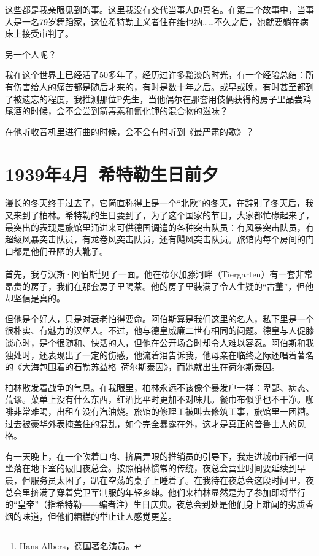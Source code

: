 \documentclass[UTF8]{ctexart}
\begin{document}
这些都是我亲眼见到的事。这里我没有交代当事人的真名。在第二个故事中，当事人是一名79岁舞蹈家，这位希特勒主义者住在维也纳……不久之后，她就要躺在病床上接受审判了。

另一个人呢？

我在这个世界上已经活了50多年了，经历过许多黯淡的时光，有一个经验总结：所有伤害给人的痛苦都是随后才来的，有时是数十年之后。或早或晚，有时甚至都到了被遗忘的程度，我推测那位P先生，当他偶尔在那套用伎俩获得的房子里品尝鸡尾酒的时候，会不会尝到箭毒素和氰化钾的混合物的滋味？

在他听收音机里进行曲的时候，会不会有时听到《最严肃的歌》？


\section{1939年4月\ 希特勒生日前夕}

漫长的冬天终于过去了，它简直称得上是一个“北欧”的冬天，在辞别了冬天后，我又来到了柏林。希特勒的生日要到了，为了这个国家的节日，大家都忙碌起来了，最突出的表现是旅馆里涌进来可供德国调遣的各种突击队员：有风暴突击队员，有超级风暴突击队员，有龙卷风突击队员，还有飓风突击队员。旅馆内每个房间的门口都是他们丑陋的大靴子。

首先，我与汉斯·阿伯斯\footnote{Hans Albers，德国著名演员。}见了一面。他在蒂尔加滕河畔（Tiergarten）有一套非常昂贵的房子，我们在那套房子里喝茶。他的房子里装满了令人生疑的“古董”，但他却坚信是真的。

但他是个好人，只是对衰老怕得要命。阿伯斯算是我们这里的名人，私下里是一个很朴实、有魅力的汉堡人。不过，他与德皇威廉二世有相同的问题。德皇与人促膝谈心时，是个很随和、快活的人，但他在公开场合时却令人难以容忍。阿伯斯和我独处时，还表现出了一定的伤感，他流着泪告诉我，他母亲在临终之际还唱着著名的《大海包围着的石勒苏益格–荷尔斯泰因》，而她就出生在荷尔斯泰因。

柏林散发着战争的气息。在我眼里，柏林永远不该像个暴发户一样：卑鄙、病态、荒谬。菜单上没有什么东西，红酒比平时更加不对味儿。餐巾布似乎也不干净。咖啡非常难喝，出租车没有汽油烧。旅馆的修理工被叫去修筑工事，旅馆里一团糟。过去被豪华外表掩盖住的混乱，如今完全暴露在外，这才是真正的普鲁士人的风格。

有一天晚上，在一个吹着口哨、挤眉弄眼的推销员的引导下，我走进城市西部一间坐落在地下室的破旧夜总会。按照柏林惯常的传统，夜总会营业时间要延续到早晨，但服务员太困了，趴在空荡的桌子上睡着了。在我待在夜总会这段时间里，夜总会里挤满了穿着党卫军制服的年轻乡绅。他们来柏林显然是为了参加即将举行的“皇帝”（指希特勒——编者注）生日庆典。夜总会到处是他们身上难闻的劣质香烟的味道，但他们糟糕的举止让人感觉更差。
\end{document}
